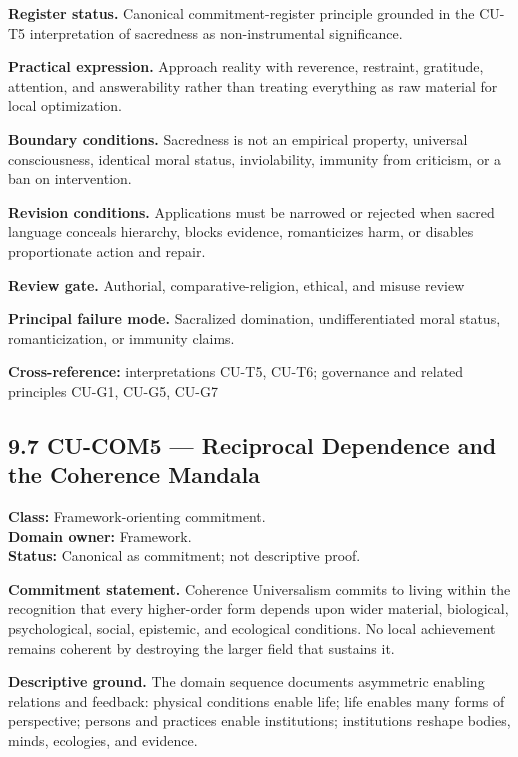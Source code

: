 \documentclass[
  11pt,
]{article}
\begin{document}
\textbf{Register status.} Canonical commitment-register principle
grounded in the CU-T5 interpretation of sacredness as non-instrumental
significance.

\textbf{Practical expression.} Approach reality with reverence,
restraint, gratitude, attention, and answerability rather than treating
everything as raw material for local optimization.

\textbf{Boundary conditions.} Sacredness is not an empirical property,
universal consciousness, identical moral status, inviolability, immunity
from criticism, or a ban on intervention.

\textbf{Revision conditions.} Applications must be narrowed or rejected
when sacred language conceals hierarchy, blocks evidence, romanticizes
harm, or disables proportionate action and repair.

\textbf{Review gate.} Authorial, comparative-religion, ethical, and
misuse review

\textbf{Principal failure mode.} Sacralized domination, undifferentiated
moral status, romanticization, or immunity claims.

\textbf{Cross-reference:} interpretations CU-T5, CU-T6; governance and
related principles CU-G1, CU-G5, CU-G7

\subsection{9.7 CU-COM5 --- Reciprocal Dependence and the Coherence
Mandala}\label{cu-com5-reciprocal-dependence-and-the-coherence-mandala}

\textbf{Class:} Framework-orienting commitment.\\
\textbf{Domain owner:} Framework.\\
\textbf{Status:} Canonical as commitment; not descriptive proof.

\textbf{Commitment statement.} Coherence Universalism commits to living
within the recognition that every higher-order form depends upon wider
material, biological, psychological, social, epistemic, and ecological
conditions. No local achievement remains coherent by destroying the
larger field that sustains it.

\textbf{Descriptive ground.} The domain sequence documents asymmetric
enabling relations and feedback: physical conditions enable life; life
enables many forms of perspective; persons and practices enable
institutions; institutions reshape bodies, minds, ecologies, and
evidence.
\end{document}
